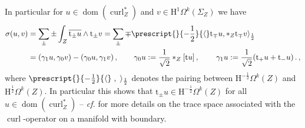 \begin{Example}
	In particular for $u\in\operatorname{dom}(\operatorname{curl}_Z^*)$ and $v\in\mathrm{H}^1\Omega^k(\Sigma_Z)$ we have
	\begin{align}\label{Eqn: simplified form for presymplectic structure}
		\sigma(u,v)&=
		\sum_\pm\pm\int_Z\overline{\mathrm{t}_\pm u}\wedge\mathrm{t}_\pm v=
		\sum_\pm\mp\prescript{}{-\frac{1}{2}}{\langle}\mathrm{t}_\mp u,\ast_Z\mathrm{t}_\mp v\rangle_{\frac{1}{2}}\\&=
		(\gamma_1u,\gamma_0v)-(\gamma_0u,\gamma_1v)\,,\qquad
		\gamma_0u:=\frac{1}{\sqrt{2}}\ast_Z[\mathrm{t}u]\,,\,\qquad
		\gamma_1u:=\frac{1}{\sqrt{2}}(\mathrm{t}_+u+\mathrm{t}_-u)\,.\,,
	\end{align}
	where $\prescript{}{-\frac{1}{2}}{\langle}\;,\;\rangle_{\frac{1}{2}}$ denotes the pairing between $\mathrm{H}^{-\frac{1}{2}}\Omega^k(Z)$ and $\mathrm{H}^{\frac{1}{2}}\Omega^k(Z)$.
	In particular this shows that $\mathrm{t}_\pm u\in\mathrm{H}^{-\frac{1}{2}}\Omega^k(Z)$ for all $u\in\operatorname{dom}(\operatorname{curl}_Z^*)$ -- \textit{cf.} \cite{Alonso-Valli-96,Buffa-Costabel-Sheen-02,Georgescu-79,Paquet-82,Weck-04} for more details on the trace space associated with the $\operatorname{curl}$-operator on a manifold with boundary.
	

\end{Example}
